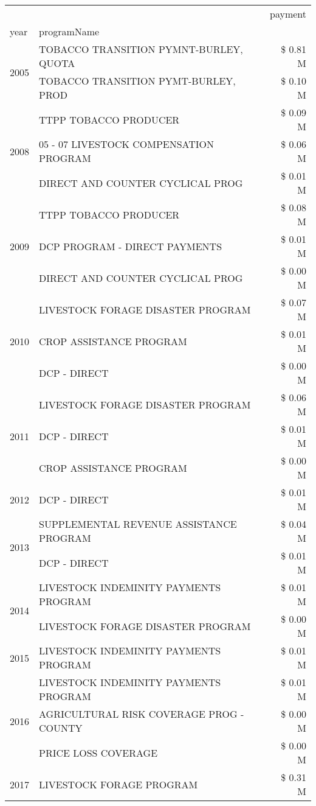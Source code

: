 \begin{tabular}{llr}
\toprule
 &  & payment \\
year & programName &  \\
\midrule
\multirow[t]{2}{*}{2005} & TOBACCO TRANSITION PYMNT-BURLEY, QUOTA & \$ 0.81 M \\
 & TOBACCO TRANSITION PYMT-BURLEY, PROD & \$ 0.10 M \\
\cline{1-3}
\multirow[t]{3}{*}{2008} & TTPP TOBACCO PRODUCER & \$ 0.09 M \\
 & 05 - 07 LIVESTOCK COMPENSATION PROGRAM & \$ 0.06 M \\
 & DIRECT AND COUNTER CYCLICAL PROG & \$ 0.01 M \\
\cline{1-3}
\multirow[t]{3}{*}{2009} & TTPP TOBACCO PRODUCER & \$ 0.08 M \\
 & DCP PROGRAM - DIRECT PAYMENTS & \$ 0.01 M \\
 & DIRECT AND COUNTER CYCLICAL PROG & \$ 0.00 M \\
\cline{1-3}
\multirow[t]{3}{*}{2010} & LIVESTOCK FORAGE DISASTER PROGRAM & \$ 0.07 M \\
 & CROP ASSISTANCE PROGRAM & \$ 0.01 M \\
 & DCP - DIRECT & \$ 0.00 M \\
\cline{1-3}
\multirow[t]{3}{*}{2011} & LIVESTOCK FORAGE DISASTER PROGRAM & \$ 0.06 M \\
 & DCP - DIRECT & \$ 0.01 M \\
 & CROP ASSISTANCE PROGRAM & \$ 0.00 M \\
\cline{1-3}
2012 & DCP - DIRECT & \$ 0.01 M \\
\cline{1-3}
\multirow[t]{2}{*}{2013} & SUPPLEMENTAL REVENUE ASSISTANCE PROGRAM & \$ 0.04 M \\
 & DCP - DIRECT & \$ 0.01 M \\
\cline{1-3}
\multirow[t]{2}{*}{2014} & LIVESTOCK INDEMINITY PAYMENTS PROGRAM & \$ 0.01 M \\
 & LIVESTOCK FORAGE DISASTER PROGRAM & \$ 0.00 M \\
\cline{1-3}
2015 & LIVESTOCK INDEMINITY PAYMENTS PROGRAM & \$ 0.01 M \\
\cline{1-3}
\multirow[t]{3}{*}{2016} & LIVESTOCK INDEMINITY PAYMENTS PROGRAM & \$ 0.01 M \\
 & AGRICULTURAL RISK COVERAGE PROG - COUNTY & \$ 0.00 M \\
 & PRICE LOSS COVERAGE & \$ 0.00 M \\
\cline{1-3}
\multirow[t]{3}{*}{2017} & LIVESTOCK FORAGE PROGRAM & \$ 0.31 M \\

\end{tabular}
